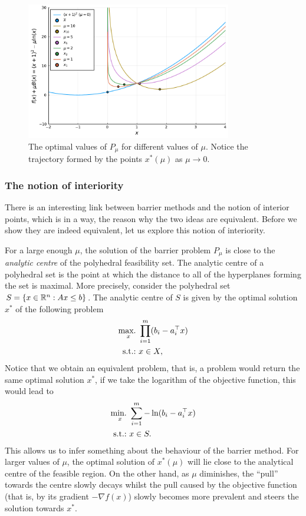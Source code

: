 \begin{figure}
	\includegraphics[width=0.8\textwidth]{part_1/chapter_7/figures/ex-barrier.pdf}
	\caption{The optimal values of $P_\mu$ for different values of $\mu$. Notice the trajectory formed by the points $x^*(\mu)$ as $\mu \to 0$.} \label{p1c7:fig:example-barrier} 	
\end{figure}


\subsubsection{The notion of interiority}

There is an interesting link between barrier methods and the notion of interior points, which is in a way, the reason why the two ideas are equivalent. Before we show they are indeed equivalent, let us explore this notion of interiority.

For a large enough $\mu$, the solution of the barrier problem $P_\mu$ is close to the \emph{analytic centre} of the polyhedral feasibility set. The analytic centre of a polyhedral set is	the point at which the distance to all of the hyperplanes forming the set is maximal. More precisely, consider the polyhedral set $S = \left\{ x \in \mathbb{R}^n : Ax \leq b \right \} $. The analytic centre of $S$ is given by the optimal solution $x^*$ of the following problem
	\begin{align*}
		\mathop{\text{max.~}}_x & \prod_{i=1}^m (b_i - a_i ^\top x) \\
		\mathop{\text{s.t.:~}} & x \in X, 	
	\end{align*}
	Notice that we obtain an equivalent problem, that is, a problem would return the same optimal solution $x^*$, if we take the logarithm of the objective function, this would lead to
	\begin{align*}
		\mathop{\text{min.~}}_x & \sum_{i=1}^m -\ln(b_i - a_i ^\top x) \\
		\mathop{\text{s.t.:~}} & x \in S. 	
	\end{align*}
	This allows us to infer something about the behaviour of the barrier method. For larger values of $\mu$, the optimal solution of $x^*(\mu)$ will lie close to the analytical centre of the feasible region. On the other hand, as $\mu$ diminishes, the ``pull'' towards the centre slowly decays whilst the pull caused by the objective function (that is, by its gradient $-\nabla f(x)$) slowly becomes more prevalent and steers the solution towards $x^*$.


